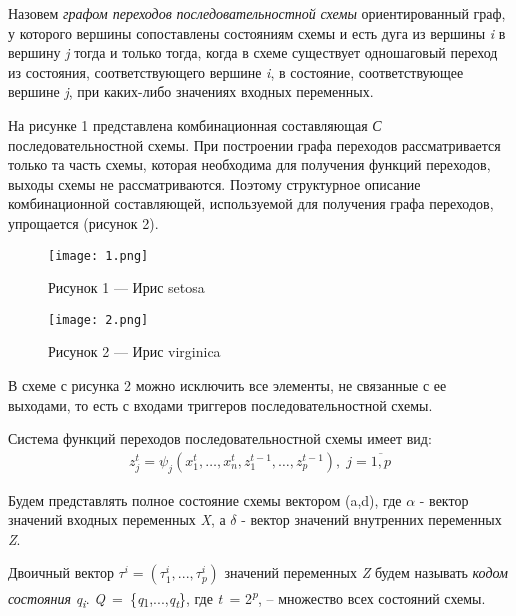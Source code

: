 \documentclass[a4paper,11pt]{article}
\begin{document}
Назовем \textit{графом переходов} \textit{последовательностной} \textit{схемы }ориентированный граф, у которого вершины сопоставлены состояниям схемы и есть дуга из вершины \textit{i} в вершину \textit{j} тогда и только тогда, когда в схеме существует одношаговый переход из состояния, соответствующего вершине \textit{i}, в состояние, соответствующее вершине \textit{j}, при каких-либо значениях входных переменных.

На рисунке 1 представлена комбинационная составляющая \textit{С} последовательностной схемы. При построении графа переходов рассматривается только та часть схемы, которая необходима для получения функций переходов, выходы схемы не рассматриваются. Поэтому структурное описание комбинационной составляющей, используемой для получения графа переходов, упрощается (рисунок 2). 

\begin{figure}[h]
    \centering
    \begin{minipage}{0.45\textwidth}
        \centering
        \texttt{[image: 1.png]}
        \caption*{Рисунок 1 --- Ирис setosa}
        \label{fig:1}
    \end{minipage}
    \hfill
    \begin{minipage}{0.45\textwidth}
        \centering
        \texttt{[image: 2.png]}
        \caption*{Рисунок 2 --- Ирис virginica}
        \label{fig:2}
    \end{minipage}
\end{figure}
В схеме с рисунка 2 можно исключить все элементы, не связанные с ее выходами, то есть с входами триггеров последовательностной схемы.

Система функций переходов последовательностной схемы имеет вид:
\begin{equation}
\begin{aligned}
z_j^t = \psi_j(x_1^t, \ldots, x_n^t, z_{1}^{t-1}, \ldots, z_{p}^{t-1}), \; j = \overline{1,p}
\end{aligned}
\tag{1}
\end{equation}

Будем представлять полное состояние схемы вектором (a,d), где $\alpha$ - вектор значений входных переменных \textit{X}, а $\delta$  - вектор значений внутренних переменных \textit{Z}.

\newpage

Двоичный вектор  $\tau^i = (\tau_{1}^i,...,\tau_{p}^i)$ значений переменных \textit{Z} будем называть \textit{кодом состояния} \textit{q\textsubscript{i}}. \textit{Q} = \{\textit{q}\textsubscript{1},...,\textit{q\textsubscript{t}}\}, где \textit{t }= 2\textit{\textsuperscript{p}}, – множество всех состояний схемы.
\end{document}
